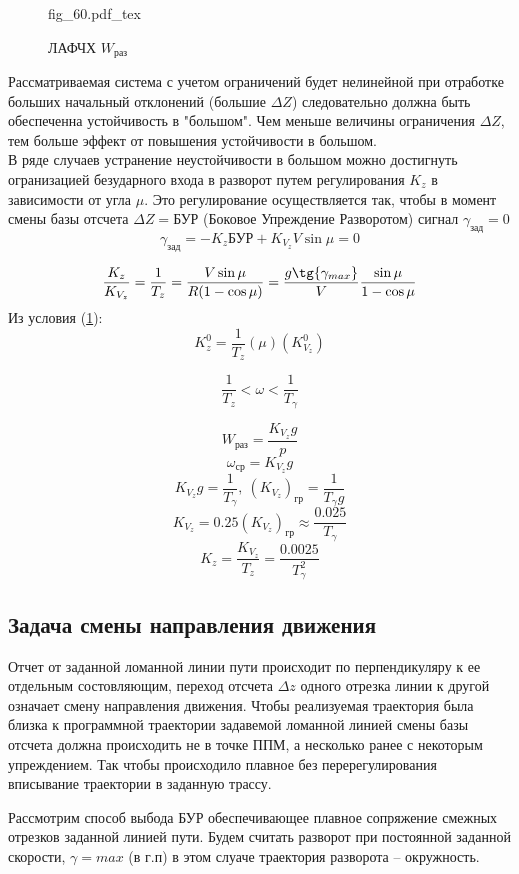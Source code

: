 \documentclass{article}
\newcommand{\incfig}[1]{
    {#1.pdf_tex}
}
\begin{document}
\begin{figure}[H]
	\centering
	\incfig{fig_60}
    \caption{ЛАФЧХ $W_\text{раз}$}
	\label{fig:fig_60}
\end{figure}

Рассматриваемая система с учетом ограничений будет нелинейной при отработке больших начальный отклонений (большие $\Delta Z$) следовательно должна быть обеспеченна устойчивость в "большом". 
Чем меньше величины ограничения $\Delta Z$, тем больше эффект от повышения устойчивости в большом.\\
В ряде случаев устранение неустойчивости в большом можно достигнуть огранизацией безударного входа в разворот путем регулирования $K_z$ в зависимости от угла $\mu$.
Это регулирование осуществляется так, чтобы в момент смены базы отсчета $\Delta Z = \text{БУР}$ (Боковое Упреждение Разворотом) сигнал $ \gamma_\text{зад} =  0$
\[
	\gamma_\text{зад} = -K_z \text{БУР} + K_{V_z} V \sin{\mu} = 0
\]

\[
	\frac{K_z}{K_{V_z}} = \frac{1}{T_z} = \frac{V \sin{\mu}}{R( 1 - \cos{\mu})} = \frac{g \tg{\gamma_{max}}}{V} \frac{\sin{\mu}}{1 - \cos{\mu}}
\]
Из условия (\ref{fig:fig_60}):
\[
	K_z^0 = \frac{1}{T_z}(\mu)(K_{V_z}^0)
\]

\[
	\frac{1}{T_z} < \omega < \frac{1}{T_\gamma}
\]

\[
	W_\text{раз} = \frac{K_{V_z} g}{p}
\]
\[
	\omega_\text{ср} = K_{V_z} g
\]
\[
	K_{V_z} g = \frac{1}{T_\gamma} , \ (K_{V_z})_\text{гр} = \frac{1}{T_\gamma g}
\]
\[
	K_{V_z} = 0.25(K_{V_z})_\text{гр} \approx \frac{0.025}{T_{\gamma}}
\]
\[
	K_z = \frac{K_{V_z}}{T_z} = \frac{0.0025}{T_\gamma^2}
\]

\subsection{Задача смены направления движения}
Отчет от заданной ломанной линии пути происходит по перпендикуляру к ее отдельным состовляющим, переход отсчета $\Delta z$ одного отрезка линии к другой означает смену направления движения. Чтобы реализуемая траектория была близка к программной траектории задавемой ломанной линией смены базы отсчета должна происходить не в точке ППМ, а несколько ранее с некоторым упреждением. Так чтобы происходило плавное без перерегулирования вписывание траектории в заданную трассу.

Рассмотрим способ выбода БУР обеспечивающее плавное сопряжение смежных отрезков заданной линией пути. Будем считать разворот при постоянной заданной скорости, $\gamma = max$ (в г.п) в этом слуаче траектория разворота -- окружность.
\end{document}
